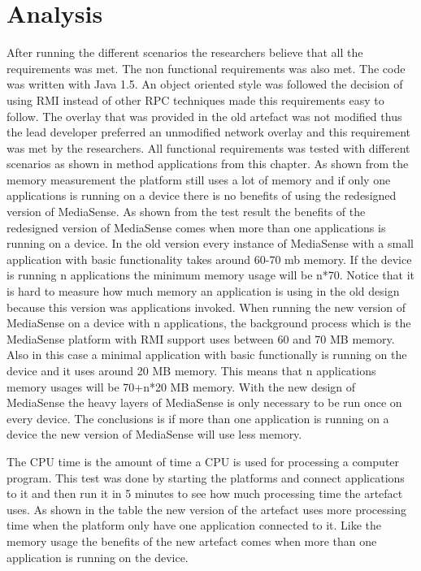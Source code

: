 \section{Analysis}
After running the different scenarios the researchers believe that all the requirements was met. The non functional requirements was also met. The code was written with Java 1.5. An object oriented style was followed the decision of using RMI instead of other RPC techniques made this requirements easy to follow. The overlay that was provided in the old artefact was not modified thus the lead developer preferred an unmodified network overlay and this requirement was met by the researchers. All functional requirements was tested with different scenarios as shown in method applications from this chapter. As shown from the memory measurement the platform still uses a lot of memory and if only one applications is running on a device there is no benefits of using the redesigned version of MediaSense. As shown from the test result the benefits of the redesigned version of MediaSense comes when more than one applications is running on a device. In the old version every instance of MediaSense with a small application with basic functionality takes around 60-70 mb memory. If the device is running n applications the minimum memory usage will be n*70. Notice that it is hard to measure how much memory an application is using in the old design because this version was applications invoked. When running the new version of MediaSense on a device with n applications, the background process which is the MediaSense platform with RMI support uses between 60 and 70 MB memory. Also in this case a minimal application with basic functionally is running on the device and it uses around 20 MB memory. This means that n applications memory usages will be 70+n*20 MB memory. With the new design of MediaSense the heavy layers of MediaSense is only necessary to be run once on every device. The conclusions is if more than one application is running on a device the new version of MediaSense will use less memory. 

The CPU time is the amount of time a CPU is used for processing a computer program. This test was done by starting the platforms and connect applications to it and then run it in 5 minutes to see how much processing time the artefact uses. As shown in the table the new version of the artefact uses more processing time when the platform only have one application connected to it. Like the memory usage the benefits of the new artefact comes when more than one application is running on the device. 

